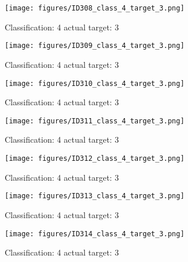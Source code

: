 \begin{figure}[h!]
\begin{center}
\texttt{[image: figures/ID308\_class\_4\_target\_3.png]}
\end{center}
\caption{ Classification: 4 actual target: 3}
\label{fig:ID308_class_4_target_3}
\end{figure}
\begin{figure}[h!]
\begin{center}
\texttt{[image: figures/ID309\_class\_4\_target\_3.png]}
\end{center}
\caption{ Classification: 4 actual target: 3}
\label{fig:ID309_class_4_target_3}
\end{figure}
\begin{figure}[h!]
\begin{center}
\texttt{[image: figures/ID310\_class\_4\_target\_3.png]}
\end{center}
\caption{ Classification: 4 actual target: 3}
\label{fig:ID310_class_4_target_3}
\end{figure}
\begin{figure}[h!]
\begin{center}
\texttt{[image: figures/ID311\_class\_4\_target\_3.png]}
\end{center}
\caption{ Classification: 4 actual target: 3}
\label{fig:ID311_class_4_target_3}
\end{figure}
\begin{figure}[h!]
\begin{center}
\texttt{[image: figures/ID312\_class\_4\_target\_3.png]}
\end{center}
\caption{ Classification: 4 actual target: 3}
\label{fig:ID312_class_4_target_3}
\end{figure}
\begin{figure}[h!]
\begin{center}
\texttt{[image: figures/ID313\_class\_4\_target\_3.png]}
\end{center}
\caption{ Classification: 4 actual target: 3}
\label{fig:ID313_class_4_target_3}
\end{figure}
\begin{figure}[h!]
\begin{center}
\texttt{[image: figures/ID314\_class\_4\_target\_3.png]}
\end{center}
\caption{ Classification: 4 actual target: 3}
\label{fig:ID314_class_4_target_3}
\end{figure}
